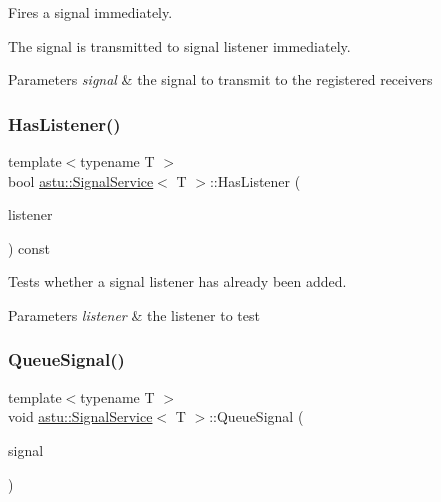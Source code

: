 Fires a signal immediately.

The signal is transmitted to signal listener immediately.


\begin{DoxyParams}{Parameters}
{\em signal} & the signal to transmit to the registered receivers \\
\hline
\end{DoxyParams}
\mbox{\label{classastu_1_1SignalService_acc4935715afef10b89fd905e714be389}} 
\subsubsection{\texorpdfstring{Has\+Listener()}{HasListener()}}
{\footnotesize\ttfamily template$<$typename T $>$ \\
bool \hyperlink{classastu_1_1SignalService}{astu\+::\+Signal\+Service}$<$ T $>$\+::Has\+Listener (\begin{DoxyParamCaption}\item[{const std\+::shared\+\_\+ptr$<$ \hyperlink{classastu_1_1ISignalListener}{I\+Signal\+Listener}$<$ T $>$$>$ \&}]{listener }\end{DoxyParamCaption}) const\hspace{0.3cm}{\ttfamily [inline]}}

Tests whether a signal listener has already been added.


\begin{DoxyParams}{Parameters}
{\em listener} & the listener to test \\
\hline
\end{DoxyParams}
\mbox{\label{classastu_1_1SignalService_aa028a039b066a779af3834ffb3bdaa18}} 
\subsubsection{\texorpdfstring{Queue\+Signal()}{QueueSignal()}}
{\footnotesize\ttfamily template$<$typename T $>$ \\
void \hyperlink{classastu_1_1SignalService}{astu\+::\+Signal\+Service}$<$ T $>$\+::Queue\+Signal (\begin{DoxyParamCaption}\item[{const T \&}]{signal }\end{DoxyParamCaption})\hspace{0.3cm}{\ttfamily [inline]}}

